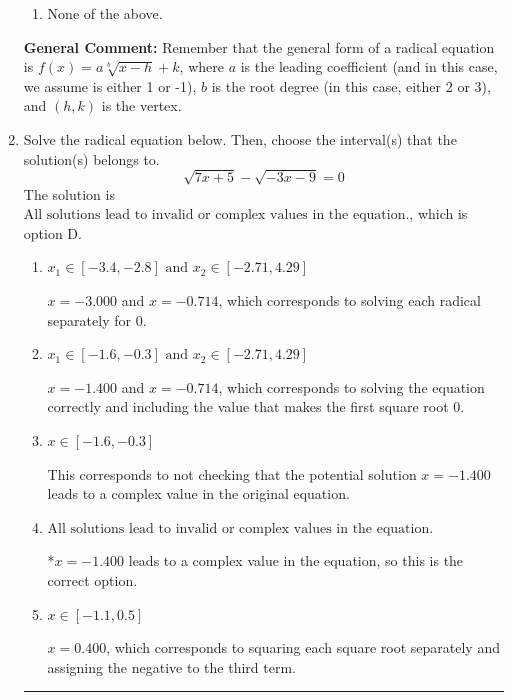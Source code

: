 \documentclass{extbook}[14pt]
\newcommand{\litem}[1]{\item #1

\rule{\textwidth}{0.4pt}}
\begin{document}
\begin{enumerate}
{\begin{enumerate}[label=\Alph*.]
\item None of the above.\end{enumerate}
\textbf{General Comment:} Remember that the general form of a radical equation is $ f(x) = a \sqrt[b]{x - h} + k $, where $a$ is the leading coefficient (and in this case, we assume is either 1 or -1), $b$ is the root degree (in this case, either 2 or 3), and $(h, k)$ is the vertex.
}
\litem{
Solve the radical equation below. Then, choose the interval(s) that the solution(s) belongs to.
\[ \sqrt{7 x + 5} - \sqrt{-3 x - 9} = 0 \]The solution is \( \text{All solutions lead to invalid or complex values in the equation.} \), which is option D.\begin{enumerate}[label=\Alph*.]
\item \( x_1 \in [-3.4, -2.8] \text{ and } x_2 \in [-2.71,4.29] \)

$x = -3.000$ and $x = -0.714$, which corresponds to solving each radical separately for 0.
\item \( x_1 \in [-1.6, -0.3] \text{ and } x_2 \in [-2.71,4.29] \)

$x = -1.400$ and $x = -0.714$, which corresponds to solving the equation correctly and including the value that makes the first square root 0.
\item \( x \in [-1.6,-0.3] \)

This corresponds to not checking that the potential solution $x = -1.400$ leads to a complex value in the original equation.
\item \( \text{All solutions lead to invalid or complex values in the equation.} \)

*$x = -1.400$ leads to a complex value in the equation, so this is the correct option.
\item \( x \in [-1.1,0.5] \)

$x = 0.400$, which corresponds to squaring each square root separately and assigning the negative to the third term.
\end{enumerate}

}
\end{enumerate}
\end{document}
